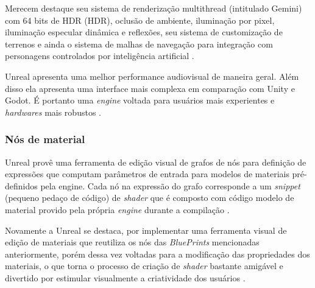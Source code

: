 \begin{figure}[h!]
	\centering
\end{figure}
\nocite{blueprint}

Merecem destaque seu sistema de renderização \Gls{multithread} (intitulado Gemini) com 64 bits de HDR (\acrlong{HDR}), oclusão de ambiente, iluminação por pixel, iluminação especular dinâmica e reflexões, seu sistema de customização de terrenos e ainda o sistema de malhas de navegação para integração com personagens controlados por inteligência artificial \cite{armstrong2013game}.

Unreal apresenta uma melhor performance audiovisual de maneira geral. Além disso ela apresenta uma interface mais complexa em comparação com Unity e Godot. É portanto uma \textit{engine} voltada para usuários mais experientes e \textit{hardwares} mais robustos \cite{stelios2017}.
 
\subsubsection{Nós de material}
\label{sec:material-nodes}

Unreal provê uma ferramenta de edição visual de grafos de nós para definição de expressões que computam parâmetros de entrada para modelos de materiais pré-definidos pela engine. Cada nó na expressão do grafo corresponde a um \textit{snippet} (pequeno pedaço de código) de \textit{shader} que é composto com código modelo de material provido pela própria \textit{engine} durante a compilação \cite{he2016rapid}.

Novamente a Unreal se destaca, por implementar uma ferramenta visual de edição de materiais que reutiliza os nós das \textit{BluePrints} mencionadas anteriormente, porém dessa vez voltadas para a modificação das propriedades dos materiais, o que torna o processo de criação de \textit{shader} bastante amigável e divertido por estimular visualmente a criatividade dos usuários \cite{compStudyGE}. 

